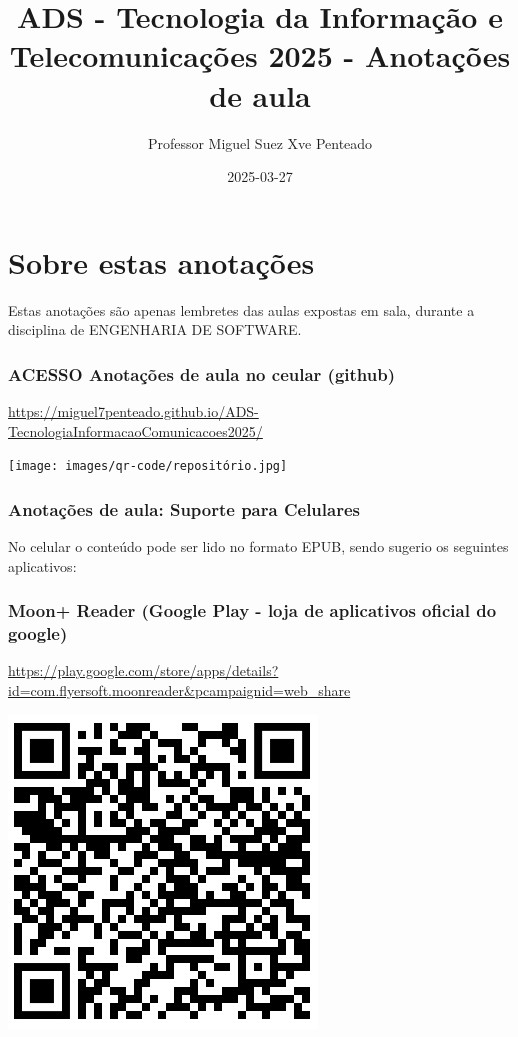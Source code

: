 \documentclass[
]{book}
\title{ADS - Tecnologia da Informação e Telecomunicações 2025 - Anotações de aula}
\author{Professor Miguel Suez Xve Penteado}
\date{2025-03-27}
\begin{document}
\maketitle

{
\setcounter{tocdepth}{1}
\tableofcontents
}
\chapter*{Sobre estas anotações}\label{sobre-estas-anotauxe7uxf5es}

Estas anotações são apenas lembretes das aulas expostas em sala, durante a disciplina de ENGENHARIA DE SOFTWARE.

\subsection{ACESSO Anotações de aula no ceular (github)}\label{acesso-anotauxe7uxf5es-de-aula-no-ceular-github}

\url{https://miguel7penteado.github.io/ADS-TecnologiaInformacaoComunicacoes2025/}

\texttt{[image: images/qr-code/repositório.jpg]}

\subsection{Anotações de aula: Suporte para Celulares}\label{anotauxe7uxf5es-de-aula-suporte-para-celulares}

No celular o conteúdo pode ser lido no formato EPUB, sendo sugerio os seguintes aplicativos:

\subsection{\texorpdfstring{\textbf{Moon+ Reader (Google Play - loja de aplicativos oficial do google)}}{Moon+ Reader (Google Play - loja de aplicativos oficial do google)}}\label{moon-reader-google-play---loja-de-aplicativos-oficial-do-google}

\url{https://play.google.com/store/apps/details?id=com.flyersoft.moonreader&pcampaignid=web_share}

\includegraphics{images/qr-code/leitor_ebook/MoonReaderPlus.jpg}
\end{document}
